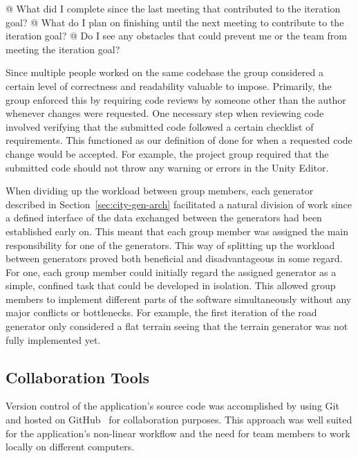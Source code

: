\begin{easylist}
  @ What did I complete since the last meeting that contributed to the iteration goal?
  @ What do I plan on finishing until the next meeting to contribute to the iteration goal?
  @ Do I see any obstacles that could prevent me or the team from meeting the iteration goal?
\end{easylist}

Since multiple people worked on the same codebase the group considered a certain level of correctness and readability valuable to impose.
Primarily, the group enforced this by requiring code reviews by someone other than the author whenever changes were requested.
One necessary step when reviewing code involved verifying that the submitted code followed a certain checklist of requirements.
This functioned as our definition of done for when a requested code change would be accepted.
For example, the project group required that the submitted code should not throw any warning or errors in the Unity Editor. 

When dividing up the workload between group members, each generator described in Section~\ref{sec:city-gen-arch} facilitated a natural division of work since a defined interface of the data exchanged between the generators had been established early on.
This meant that each group member was assigned the main responsibility for one of the generators. This way of splitting up the workload between generators proved both beneficial and disadvantageous in some regard.
For one, each group member could initially regard the assigned generator as a simple, confined task that could be developed in isolation.
This allowed group members to implement different parts of the software simultaneously without any major conflicts or bottlenecks.
For example, the first iteration of the road generator only considered a flat terrain seeing that the terrain generator was not fully implemented yet.

\subsection{Collaboration Tools}
Version control of the application's source code was accomplished by using Git~\cite{git} and hosted on GitHub~\cite{github} for collaboration purposes.
This approach was well suited for the application's non-linear workflow and the need for team members to work locally on different computers.

